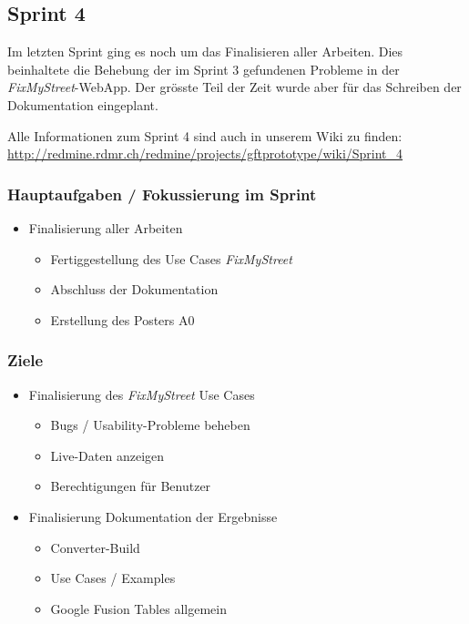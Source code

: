 \subsection{Sprint 4}

Im letzten Sprint ging es noch um das Finalisieren aller Arbeiten. Dies beinhaltete die Behebung der im Sprint 3 gefundenen Probleme in der \emph{FixMyStreet}-WebApp. Der grösste Teil der Zeit wurde aber für das Schreiben der Dokumentation eingeplant. 

Alle Informationen zum Sprint 4 sind auch in unserem Wiki zu finden:
\url{http://redmine.rdmr.ch/redmine/projects/gftprototype/wiki/Sprint_4}

\subsubsection{Hauptaufgaben / Fokussierung im Sprint}
\begin{itemize}
	\item Finalisierung aller Arbeiten
	\begin{itemize}
		\item Fertiggestellung des Use Cases \emph{FixMyStreet}
		\item Abschluss der Dokumentation
		\item Erstellung des Posters A0
	\end{itemize}
\end{itemize}

\subsubsection{Ziele}
\begin{itemize}
	\item Finalisierung des \emph{FixMyStreet} Use Cases
	\begin{itemize}
		\item Bugs / Usability-Probleme beheben
		\item Live-Daten anzeigen
		\item Berechtigungen für Benutzer
	\end{itemize}
	
	\item Finalisierung Dokumentation der Ergebnisse
	\begin{itemize}
		\item Converter-Build
		\item Use Cases / Examples
		\item Google Fusion Tables allgemein
	\end{itemize}
\end{itemize}

